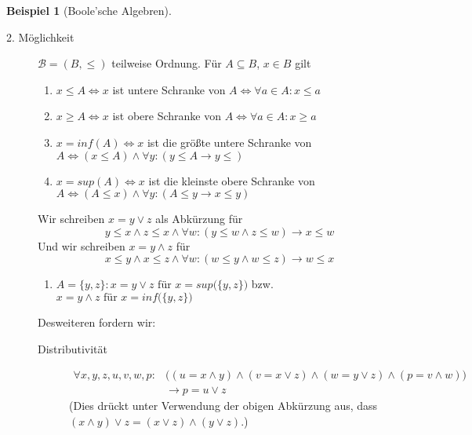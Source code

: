 \documentclass{article}
\theoremstyle{definition}
\newtheorem*{bsp}{Beispiel}
\theoremstyle{plain}
\newcommand{\m}[1]{\mathcal{#1}}
\begin{document}
\begin{bsp}[Boole'sche Algebren]
\begin{description}
            \item[2. Möglichkeit]
            \label{itm:boolesche-algebra-ordnung}
            $ \m{B} = (B, \leq) $ teilweise Ordnung.
            Für $ A \subseteq B $, $ x \in B $ gilt
            \begin{enumerate}[series=teilweise-ordnung-voraussetzung]
                \item $ x \leq A \Leftrightarrow x $ ist untere Schranke von $ A  \Leftrightarrow \forall a \in A: x \leq a $
                \item $ x \geq A \Leftrightarrow x $ ist obere Schranke von $ A \Leftrightarrow \forall a \in A: x \geq a $
                \item $ x = inf(A) \Leftrightarrow x $ ist die größte untere Schranke von $ A \Leftrightarrow (x \leq A) \land \forall y: (y \leq A \rightarrow y \leq ) $
                \item $ x = sup(A) \Leftrightarrow x $ ist die kleinste obere Schranke von $ A \Leftrightarrow (A \leq x) \land \forall y: (A \leq y \rightarrow x \leq y) $
            \end{enumerate}

            Wir schreiben $ x = y \lor z $ als Abkürzung für
            \begin{equation*}
                y \leq x \land z \leq x \land \forall w: (y \leq w \land z \leq w) \rightarrow x \leq w
            \end{equation*}
            Und wir schreiben $ x = y \land z $ für
            \begin{equation*}
                x \leq y \land x \leq z \land \forall w: (w \leq y \land w \leq z) \rightarrow w \leq x
            \end{equation*}

            \begin{enumerate}[resume*=teilweise-ordnung-voraussetzung]
                \item $ A = \{y, z\}: x = y \lor z \text{ für } x = sup\big(\{y, z\}\big) $ bzw. $ x = y \land z \text{ für } x = inf\big(\{y, z\}\big) $
            \end{enumerate}

            Desweiteren fordern wir:
            \begin{description}
                \item[Distributivität]
                \begin{equation}
                \label{eq:boolesch-distributiv}
                    \begin{aligned}
                        \forall x, y, z, u, v, w, p: & \big((u = x \land y) \land (v = x \lor z) \land (w = y \lor z) \land (p = v \land w)\big) \\
                        & \rightarrow p = u \lor z
                    \end{aligned}
                \end{equation}
                (Dies drückt unter Verwendung der obigen Abkürzung aus, dass $ (x \land y) \lor z = (x \lor z) \land (y \lor z) $.)
            \end{description}


\end{description}
\end{bsp}
\end{document}

